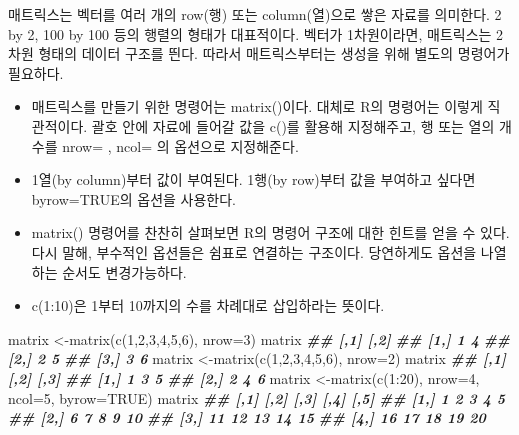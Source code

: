 \documentclass[
]{book}
\newenvironment{Shaded}{\begin{snugshade}}{\end{snugshade}}
\newcommand{\AttributeTok}[1]{\textcolor[rgb]{0.77,0.63,0.00}{#1}}
\newcommand{\ConstantTok}[1]{\textcolor[rgb]{0.00,0.00,0.00}{#1}}
\newcommand{\DecValTok}[1]{\textcolor[rgb]{0.00,0.00,0.81}{#1}}
\newcommand{\DocumentationTok}[1]{\textcolor[rgb]{0.56,0.35,0.01}{\textbf{\textit{#1}}}}
\newcommand{\FunctionTok}[1]{\textcolor[rgb]{0.00,0.00,0.00}{#1}}
\newcommand{\NormalTok}[1]{#1}
\newcommand{\OtherTok}[1]{\textcolor[rgb]{0.56,0.35,0.01}{#1}}
\newcommand{\SpecialCharTok}[1]{\textcolor[rgb]{0.00,0.00,0.00}{#1}}
\providecommand{\tightlist}{%
  \setlength{\itemsep}{0pt}\setlength{\parskip}{0pt}}
\theoremstyle{definition}
\theoremstyle{definition}
\theoremstyle{definition}
\theoremstyle{definition}
\theoremstyle{remark}
\begin{document}
매트릭스는 벡터를 여러 개의 row(행) 또는 column(열)으로 쌓은 자료를 의미한다. 2 by 2, 100 by 100 등의 행렬의 형태가 대표적이다. 벡터가 1차원이라면, 매트릭스는 2차원 형태의 데이터 구조를 띈다. 따라서 매트릭스부터는 생성을 위해 별도의 명령어가 필요하다.

\begin{itemize}
\tightlist
\item
  매트릭스를 만들기 위한 명령어는 matrix()이다. 대체로 R의 명령어는 이렇게 직관적이다. 괄호 안에 자료에 들어갈 값을 c()를 활용해 지정해주고, 행 또는 열의 개수를 nrow= , ncol= 의 옵션으로 지정해준다.
\item
  1열(by column)부터 값이 부여된다. 1행(by row)부터 값을 부여하고 싶다면 byrow=TRUE의 옵션을 사용한다.
\item
  matrix() 명령어를 찬찬히 살펴보면 R의 명령어 구조에 대한 힌트를 얻을 수 있다. 다시 말해, 부수적인 옵션들은 쉼표로 연결하는 구조이다. 당연하게도 옵션을 나열하는 순서도 변경가능하다.
\item
  c(1:10)은 1부터 10까지의 수를 차례대로 삽입하라는 뜻이다.
\end{itemize}

\begin{Shaded}
\begin{Highlighting}[]
\NormalTok{matrix }\OtherTok{\textless{}{-}}\FunctionTok{matrix}\NormalTok{(}\FunctionTok{c}\NormalTok{(}\DecValTok{1}\NormalTok{,}\DecValTok{2}\NormalTok{,}\DecValTok{3}\NormalTok{,}\DecValTok{4}\NormalTok{,}\DecValTok{5}\NormalTok{,}\DecValTok{6}\NormalTok{), }\AttributeTok{nrow=}\DecValTok{3}\NormalTok{)}
\NormalTok{matrix}
\DocumentationTok{\#\#      [,1] [,2]}
\DocumentationTok{\#\# [1,]    1    4}
\DocumentationTok{\#\# [2,]    2    5}
\DocumentationTok{\#\# [3,]    3    6}
\NormalTok{matrix }\OtherTok{\textless{}{-}}\FunctionTok{matrix}\NormalTok{(}\FunctionTok{c}\NormalTok{(}\DecValTok{1}\NormalTok{,}\DecValTok{2}\NormalTok{,}\DecValTok{3}\NormalTok{,}\DecValTok{4}\NormalTok{,}\DecValTok{5}\NormalTok{,}\DecValTok{6}\NormalTok{), }\AttributeTok{nrow=}\DecValTok{2}\NormalTok{)}
\NormalTok{matrix}
\DocumentationTok{\#\#      [,1] [,2] [,3]}
\DocumentationTok{\#\# [1,]    1    3    5}
\DocumentationTok{\#\# [2,]    2    4    6}
\NormalTok{matrix }\OtherTok{\textless{}{-}}\FunctionTok{matrix}\NormalTok{(}\FunctionTok{c}\NormalTok{(}\DecValTok{1}\SpecialCharTok{:}\DecValTok{20}\NormalTok{), }\AttributeTok{nrow=}\DecValTok{4}\NormalTok{, }\AttributeTok{ncol=}\DecValTok{5}\NormalTok{, }\AttributeTok{byrow=}\ConstantTok{TRUE}\NormalTok{)}
\NormalTok{matrix}
\DocumentationTok{\#\#      [,1] [,2] [,3] [,4] [,5]}
\DocumentationTok{\#\# [1,]    1    2    3    4    5}
\DocumentationTok{\#\# [2,]    6    7    8    9   10}
\DocumentationTok{\#\# [3,]   11   12   13   14   15}
\DocumentationTok{\#\# [4,]   16   17   18   19   20}
\end{Highlighting}
\end{Shaded}
\end{document}
